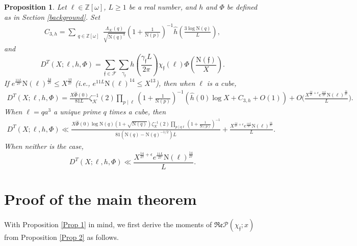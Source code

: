 \documentclass[11pt]{amsart}
\newcommand{\norm}{\mathrm{N}}
\newtheorem{prop}{Proposition}[section]
\numberwithin{equation}{section}
\renewcommand{\Re}{{\mathfrak{Re}}}
\theoremstyle{remark}
\begin{document}
\begin{prop}\label{Prop 3}
    Let $\ell\in \mathbb{Z}[\omega]$, $L\ge 1$ be a real number, and $h$ and $\Phi$ be defined as in Section \ref{background}. Set
    \begin{align}\label{eq. the c constant}
    C_{3, h}=\sum_{\substack{q\in \mathbb{Z}[\omega] }}
    \frac{\Lambda_\mathcal{K}(q)}{\sqrt{\norm(q)^3}}
    \left(1+\frac{1}{\norm(p)}\right)^{-1}   
	\hat{h}\left(\frac{3\log \norm(q)}{L}\right), 
\end{align}
and
$$
D^T(X;\ell,h, \Phi)=\sum_{\mathfrak{f}\in\mathcal{F}} \sum_{\gamma_{\mathfrak{f}}} h\left( \frac{\gamma_{\mathfrak{f}} L}{2\pi}\right)\chi_\mathfrak{f}(\ell) \Phi\left(\frac{\norm(\mathfrak{f})}{X}\right).
$$
    If $e^{\frac{11L}{27}}\norm(\ell)^{\frac{14}{27}}\le X^{\frac{13}{27}}$
(i.e., $e^{11L}\norm(\ell)^{14}\le X^{13}$), then when $\ell$ is a cube,
\begin{align*}
D^T(X;\ell,h, \Phi)=
 \frac{X\widehat{\Phi}(0)}{81L}  \zeta^{-1}_\mathcal{K}(2)  \prod_{p\mid \ell}\left(1+\frac{1}{\norm(p)}\right)^{-1} 
 \left(\hat{h}(0) \log X + C_{3,h}+ O(1)\right) 
 + O\bigg( \frac{X^{\frac{14}{27}+\epsilon}e^{\frac{11L}{27}}\norm(\ell)^{\frac{14}{27}}}{L} \bigg).
\end{align*}
When $\ell=qa^3$ a unique prime $q$ times a cube, then
\begin{align*}
D^T(X;\ell,h, \Phi)
\ll
     \frac{X\widehat{\Phi}(0)\log\norm(q)(1+\sqrt{\norm(q)})\zeta^{-1}_\mathcal{K}(2)  \prod_{p\mid q \ell }(1+\frac{1}{\norm(p)})^{-1}}{81(\norm(q)-\norm(q)^{-1/2})L} 
    + 
    \frac{X^{\frac{14}{27}+\epsilon}e^{\frac{11L}{27}}\norm(\ell)^{\frac{14}{27}}}{L}.
\end{align*}
    When neither is the case, 
    $$
    D^T(X;\ell,h, \Phi)
    \ll
    \frac{X^{\frac{14}{27}+\epsilon}e^{\frac{11L}{27}}\norm(\ell)^{\frac{14}{27}}}{L}.$$
\end{prop}




\section{Proof of the main theorem}


With Proposition \ref{Prop 1} in mind, we first derive the moments of $\Re \mathcal{P}(\chi_\mathfrak{f}; x) $ from Proposition \ref{Prop 2} as follows.
\end{document}
